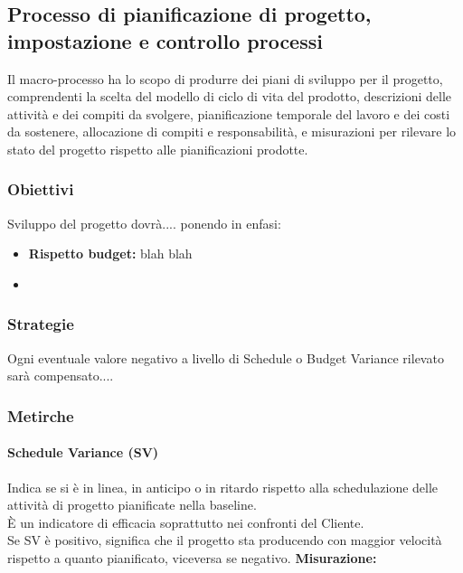 \documentclass[PianoDiQualifica.tex]{subfiles}
\begin{document}
\subsection{Processo di pianificazione di progetto, impostazione e controllo processi}
Il macro-processo ha lo scopo di produrre dei piani di sviluppo per il progetto, comprendenti
la scelta del modello di ciclo di vita del prodotto, descrizioni delle attività e dei compiti
da svolgere, pianificazione temporale del lavoro e dei costi da sostenere, allocazione di compiti e
responsabilità, e misurazioni per rilevare lo stato del progetto rispetto alle pianificazioni prodotte.
\subsubsection{Obiettivi}
Sviluppo del progetto dovrà.... ponendo in enfasi:
\begin{itemize}
	\item \textbf{Rispetto budget:} blah blah 
	\item %
\end{itemize}

\subsubsection{Strategie}
Ogni eventuale valore negativo a livello di Schedule o Budget Variance rilevato sarà compensato....

\subsubsection{Metirche} %
\paragraph{Schedule Variance (SV)}
Indica se si è in linea, in anticipo o in ritardo rispetto alla schedulazione delle attività di progetto pianificate nella baseline.\\
È un indicatore di efficacia soprattutto nei confronti del Cliente. \\
Se SV è positivo, significa che il progetto sta producendo con maggior velocità rispetto a quanto pianificato, viceversa se negativo.
\textbf{Misurazione:}
\end{document}
